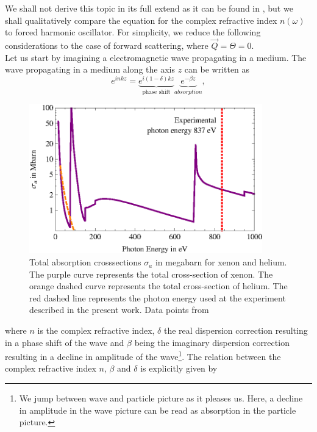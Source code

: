 We shall not derive this topic in its full extend as it can be found in \citep[see][p. 55ff]{Attwood-2007-CUP}, but we shall qualitatively compare the equation for the complex refractive index $n\left(\omega\right)$ to forced harmonic oscillator. For simplicity, we reduce the following considerations to the case of forward scattering, where $\vec{Q}=\Theta=0$.\\
Let us start by imagining a electromagnetic wave propagating in a medium. The wave propagating in a medium along the axis $z$ can be written as
\begin{equation}
e^{i n k z}= \underbrace{e^{i \left(1-\delta\right)k z}}_{\text{phase shift}}\underbrace{e^{-\beta z}}_{absorption},
\label{eq:wave-in-medium}
\end{equation}
\begin{figure}
	\centering
		\includegraphics[width=0.90\textwidth]{images/photoionization.eps}
	\caption[Total absorption cross-sections for helium and xenon.]{Total absorption crosssections $\sigma_{a}$ in megabarn for xenon and helium. The purple curve represents the total cross-section of xenon. The orange dashed curve represents the total cross-section of helium. The red dashed line represents the photon energy used at the experiment described in the present work. Data points from \citep{Elettra-2016-Website,Yeh-1985-AtmDat,Yeh-1993-GBSP}}
	\label{fig:photoionization}
\end{figure}
where $n$ is the complex refractive index, $\delta$ the real dispersion correction resulting in a phase shift of the wave and $\beta$ being the imaginary dispersion correction resulting in a decline in amplitude of the wave\footnote{We jump between wave and particle picture as it pleases us. Here, a decline in amplitude in the wave picture can be read as absorption in the particle picture.}. The relation between the complex refractive index $n$, $\beta$ and $\delta$ is explicitly given by
